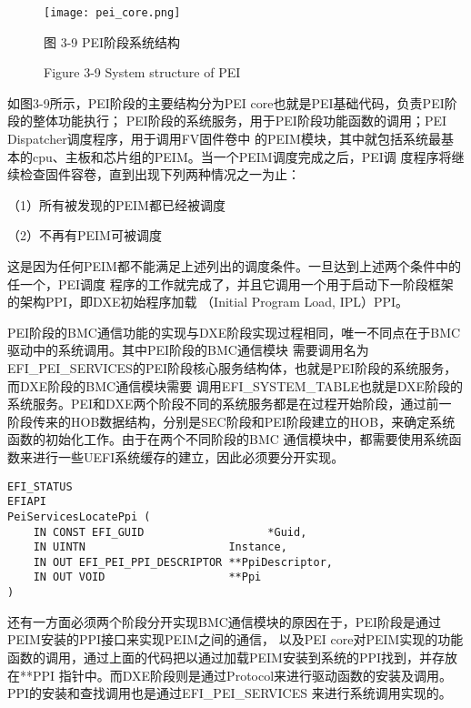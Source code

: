 \begin{figure}[htb]
    \vspace{0cm}   
    \setlength{\abovecaptionskip}{0.3cm}
	\centering
    \texttt{[image: pei\_core.png]}
    \caption*{图 3-9 PEI阶段系统结构}
    \setlength{\belowcaptionskip}{-0.7cm}
    \caption*{Figure 3-9 System structure of PEI}
\end{figure}

如图3-9所示，PEI阶段的主要结构分为PEI core也就是PEI基础代码，负责PEI阶段的整体功能执行；
PEI阶段的系统服务，用于PEI阶段功能函数的调用；PEI Dispatcher调度程序，用于调用FV固件卷中
的PEIM模块，其中就包括系统最基本的cpu、主板和芯片组的PEIM。当一个PEIM调度完成之后，PEI调
度程序将继续检查固件容卷，直到出现下列两种情况之一为止：
\par （1）所有被发现的PEIM都已经被调度
\par （2）不再有PEIM可被调度
\par 这是因为任何PEIM都不能满足上述列出的调度条件。一旦达到上述两个条件中的任一个，PEI调度
程序的工作就完成了，并且它调用一个用于启动下一阶段框架的架构PPI，即DXE初始程序加载
（Initial Program Load, IPL）PPI。

\par PEI阶段的BMC通信功能的实现与DXE阶段实现过程相同，唯一不同点在于BMC驱动中的系统调用。其中PEI阶段的BMC通信模块
需要调用名为EFI\_PEI\_SERVICES的PEI阶段核心服务结构体，也就是PEI阶段的系统服务，而DXE阶段的BMC通信模块需要
调用EFI\_SYSTEM\_TABLE也就是DXE阶段的系统服务。PEI和DXE两个阶段不同的系统服务都是在过程开始阶段，通过前一
阶段传来的HOB数据结构，分别是SEC阶段和PEI阶段建立的HOB，来确定系统函数的初始化工作。由于在两个不同阶段的BMC
通信模块中，都需要使用系统函数来进行一些UEFI系统缓存的建立，因此必须要分开实现。

\begin{lstlisting}
EFI_STATUS
EFIAPI
PeiServicesLocatePpi (
    IN CONST EFI_GUID                   *Guid,
    IN UINTN                      Instance,
    IN OUT EFI_PEI_PPI_DESCRIPTOR **PpiDescriptor,
    IN OUT VOID                   **Ppi
)
\end{lstlisting}
还有一方面必须两个阶段分开实现BMC通信模块的原因在于，PEI阶段是通过PEIM安装的PPI接口来实现PEIM之间的通信，
以及PEI core对PEIM实现的功能函数的调用，通过上面的代码把以通过加载PEIM安装到系统的PPI找到，并存放在**PPI
指针中。而DXE阶段则是通过Protocol来进行驱动函数的安装及调用。PPI的安装和查找调用也是通过EFI\_PEI\_SERVICES
来进行系统调用实现的。

